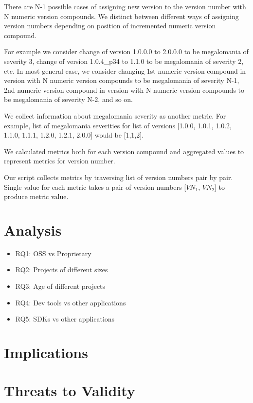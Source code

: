 \documentclass[conference]{IEEEtran}
\begin{document}
\begin{itemize}
There are N-1 possible cases of assigning new version to the version number with N numeric version compounds. We distinct between different ways of assigning version numbers depending on position of incremented numeric version compound. 

For example we consider change of version 1.0.0.0 to 2.0.0.0 to be megalomania of severity 3, change of version 1.0.4\_p34 to 1.1.0 to be megalomania of severity 2, etc. In most general case, we consider changing 1st numeric version compound in version with N numeric version compounds to be megalomania of severity N-1, 2nd numeric version compound in version with N numeric version compounds to be megalomania of severity N-2, and so on. 

We collect information about megalomania severity as another metric. For example, list of megalomania severities for list of versions [1.0.0, 1.0.1, 1.0.2, 1.1.0, 1.1.1, 1.2.0, 1.2.1, 2.0.0] would be [1,1,2].

We calculated metrics both for each version compound and aggregated values to represent metrics for  version number.
\end{itemize}

Our script collects metrics by traversing list of version numbers pair by pair. Single value for each metric takes a pair of version numbers [$VN_{1}$, $VN_{2}$] to produce metric value.

\section{Analysis}

\begin{itemize}
\item RQ1: OSS vs Proprietary
\item RQ2: Projects of different sizes
\item RQ3: Age of different projects
\item RQ4: Dev tools vs other applications
\item RQ5: SDKs vs other applications 
\end{itemize}


\section{Implications}

\section{Threats to Validity}
\end{document}
